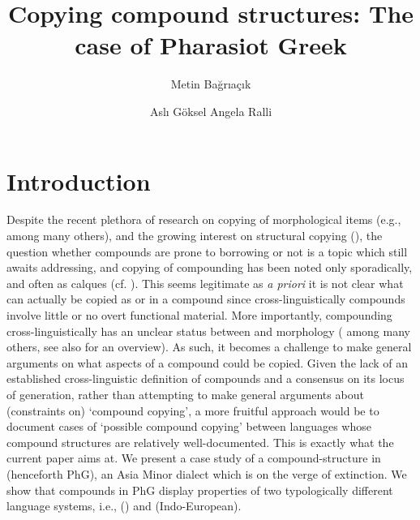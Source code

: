 \documentclass[output=paper]{LSP/langsci}
\author{Metin Bağrıaçık\affiliation{Ghent University}\and
 Aslı Göksel\affiliation{Boğaziçi University}\lastand 
Angela Ralli\affiliation{University of Patras}
}
\title{Copying compound structures: The case of Pharasiot Greek}
\begin{document}
 
\section{Introduction} 
 Despite the recent plethora of research on copying of morphological items (e.g., \citealt{Johanson1992,Gardani2008, Seifart2015b,Seifart2015a,Gardanietal2015} among many others), and the growing interest on structural copying (\citealt{Bowern2008,LepschyTosi2006, Lucas2012,Grimstadetal2014,Lohndal2013,Aboh2015,Thomasonforth}), the question whether compounds are prone to borrowing or not is a topic which still awaits addressing, and copying of compounding has been noted only sporadically, and often as calques (cf. \citealt{Ralli2014}). This seems legitimate as \textit{a priori} it is not clear what can actually be copied as or in a compound since cross-linguistically compounds involve little or no overt functional material.  More importantly, compounding cross-linguistically has an unclear status between  and morphology (\citealt{Anderson1992,Aronoff1994,DiSciullo2005} among many others, see also \citealt[4--5]{ScaliseVogel2010why} for an overview). As such, it becomes a challenge to make general arguments on what aspects of a compound could be copied. Given the lack of an established cross-linguistic definition of compounds and a consensus on its locus of generation, rather than attempting to make general arguments about (constraints on) `compound copying', a more fruitful approach would be to document cases of `possible compound copying' between languages whose compound structures are relatively well-documented. This is exactly what the current paper aims at. We present a case study of a compound-structure in  (henceforth PhG), an Asia Minor  dialect which is on the verge of extinction. We show that compounds in PhG display properties of  two typologically different language systems, i.e.,  () and  (Indo-European).  
 
\end{document}

